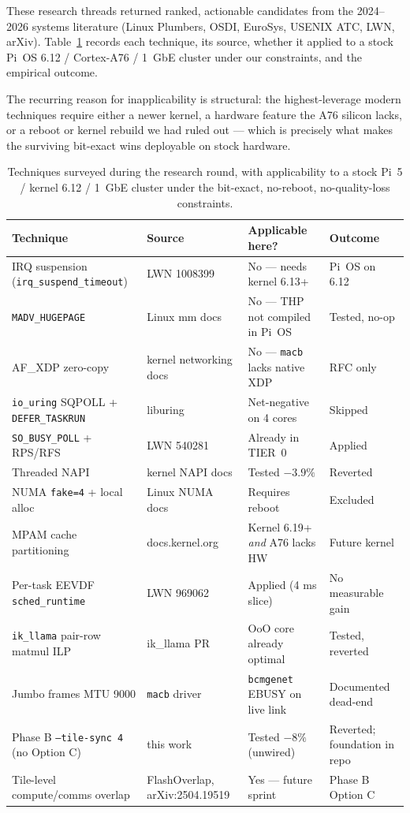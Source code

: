 \documentclass[10pt,a4paper]{article}
\begin{document}
These research threads returned ranked, actionable candidates from the 2024--2026 systems literature (Linux Plumbers, OSDI, EuroSys, USENIX ATC, LWN, arXiv). Table~\ref{tab:litsurvey} records each technique, its source, whether it applied to a stock Pi~OS 6.12 / Cortex-A76 / 1~GbE cluster under our constraints, and the empirical outcome.

The recurring reason for inapplicability is structural: the highest-leverage modern techniques require either a newer kernel, a hardware feature the A76 silicon lacks, or a reboot or kernel rebuild we had ruled out --- which is precisely what makes the surviving bit-exact wins deployable on stock hardware.

\begin{table}[H]
\centering
\scriptsize
\caption{Techniques surveyed during the research round, with applicability to a stock Pi~5 / kernel 6.12 / 1~GbE cluster under the bit-exact, no-reboot, no-quality-loss constraints.}
\label{tab:litsurvey}
\begin{tabular}{p{4.0cm}p{2.7cm}p{3.1cm}p{3.1cm}}
\toprule
\textbf{Technique} & \textbf{Source} & \textbf{Applicable here?} & \textbf{Outcome} \\
\midrule
IRQ suspension (\texttt{irq\_suspend\_timeout}) & LWN 1008399 & No --- needs kernel 6.13+ & Pi~OS on 6.12 \\
\texttt{MADV\_HUGEPAGE} & Linux mm docs & No --- THP not compiled in Pi~OS & Tested, no-op \\
AF\_XDP zero-copy & kernel networking docs & No --- \texttt{macb} lacks native XDP & RFC only \\
\texttt{io\_uring} SQPOLL + \texttt{DEFER\_TASKRUN} & liburing & Net-negative on 4 cores & Skipped \\
\texttt{SO\_BUSY\_POLL} + RPS/RFS & LWN 540281 & Already in TIER~0 & Applied \\
Threaded NAPI & kernel NAPI docs & Tested $-3.9\%$ & Reverted \\
NUMA \texttt{fake=4} + local alloc & Linux NUMA docs & Requires reboot & Excluded \\
MPAM cache partitioning & docs.kernel.org & Kernel 6.19+ \emph{and} A76 lacks HW & Future kernel \\
Per-task EEVDF \texttt{sched\_runtime} & LWN 969062 & Applied (4 ms slice) & No measurable gain \\
\texttt{ik\_llama} pair-row matmul ILP & ik\_llama PR & OoO core already optimal & Tested, reverted \\
Jumbo frames MTU 9000 & \texttt{macb} driver & \texttt{bcmgenet} EBUSY on live link & Documented dead-end \\
Phase B \texttt{--tile-sync 4} (no Option C) & this work & Tested $-8\%$ (unwired) & Reverted; foundation in repo \\
Tile-level compute/comms overlap & FlashOverlap, arXiv:2504.19519 & Yes --- future sprint & Phase B Option C \\
\bottomrule
\end{tabular}
\end{table}
\end{document}
